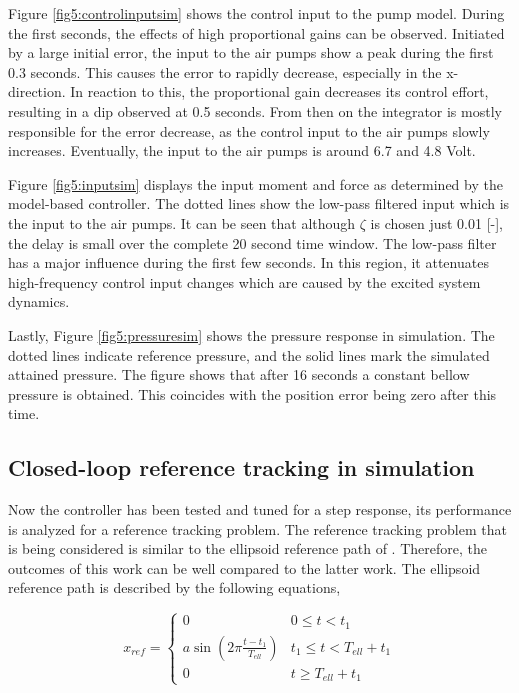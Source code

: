Figure \ref{fig5:controlinputsim} shows the control input to the pump model. During the first seconds, the effects of high proportional gains can be observed. Initiated by a large initial error, the input to the air pumps show a peak during the first 0.3 seconds. This causes the error to rapidly decrease, especially in the x-direction. In reaction to this, the proportional gain decreases its control effort, resulting in a dip observed at 0.5 seconds. From then on the integrator is mostly responsible for the error decrease, as the control input to the air pumps slowly increases. Eventually, the input to the air pumps is around 6.7 and 4.8 Volt. 

Figure \ref{fig5:inputsim} displays the input moment and force as determined by the model-based controller. The dotted lines show the low-pass filtered input which is the input to the air pumps. It can be seen that although $\zeta$ is chosen just 0.01 [-], the delay is small over the complete 20 second time window. The low-pass filter has a major influence during the first few seconds. In this region, it attenuates high-frequency control input changes which are caused by the excited system dynamics. 


Lastly, Figure \ref{fig5:pressuresim} shows the pressure response in simulation. The dotted lines indicate reference pressure, and the solid lines mark the simulated attained pressure. The figure shows that after 16 seconds a constant bellow pressure is obtained. This coincides with the position error being zero after this time.



\subsection*{Closed-loop reference tracking in simulation}

Now the controller has been tested and tuned for a step response, its performance is analyzed for a reference tracking problem. The reference tracking problem that is being considered is similar to the ellipsoid reference path of \cite{berkers}. Therefore, the outcomes of this work can be well compared to the latter work. The ellipsoid reference path is described by the following equations,

\begin{equation}
    x_{ref} = \begin{cases} 
      0 &  0 \leq t < t_1 \\
     a \sin(2\pi \frac{t - t_1}{T_{ell}}) &t_1 \leq t  < T_{ell} + t_1 \\
     0 & t \geq T_{ell} + t_1
   \end{cases} 
\end{equation}

